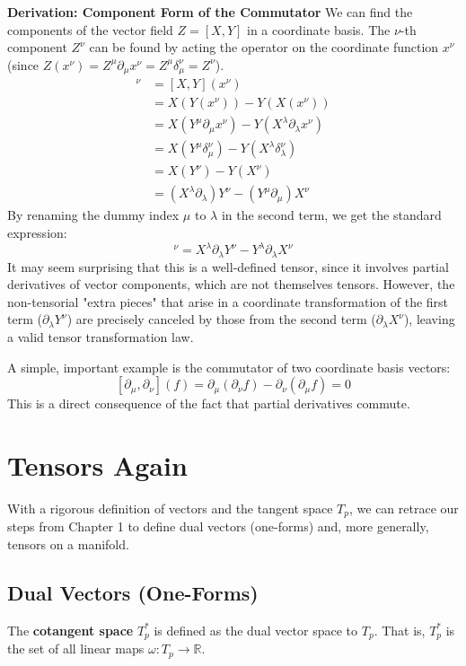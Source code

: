 \documentclass[11pt, a4paper]{report}
\begin{document}
\textbf{Derivation: Component Form of the Commutator}
We can find the components of the vector field $Z = [X, Y]$ in a coordinate basis. The $\nu$-th component $Z^\nu$ can be found by acting the operator on the coordinate function $x^\nu$ (since $Z(x^\nu) = Z^\mu \partial_\mu x^\nu = Z^\mu \delta^\nu_\mu = Z^\nu$).
\begin{align*}
    [X, Y]^\nu &= [X, Y](x^\nu) \\
    &= X(Y(x^\nu)) - Y(X(x^\nu)) \\
    &= X(Y^\mu \partial_\mu x^\nu) - Y(X^\lambda \partial_\lambda x^\nu) \\
    &= X(Y^\mu \delta^\nu_\mu) - Y(X^\lambda \delta^\nu_\lambda) \\
    &= X(Y^\nu) - Y(X^\nu) \\
    &= (X^\lambda \partial_\lambda) Y^\nu - (Y^\mu \partial_\mu) X^\nu
\end{align*}
By renaming the dummy index $\mu$ to $\lambda$ in the second term, we get the standard expression:
\begin{equation}
    [X, Y]^\nu = X^\lambda \partial_\lambda Y^\nu - Y^\lambda \partial_\lambda X^\nu
\end{equation}
It may seem surprising that this is a well-defined tensor, since it involves partial derivatives of vector components, which are not themselves tensors. However, the non-tensorial "extra pieces" that arise in a coordinate transformation of the first term ($\partial_\lambda Y^\nu$) are precisely canceled by those from the second term ($\partial_\lambda X^\nu$), leaving a valid tensor transformation law.

A simple, important example is the commutator of two coordinate basis vectors:
\[
    [\partial_\mu, \partial_\nu](f) = \partial_\mu(\partial_\nu f) - \partial_\nu(\partial_\mu f) = 0
\]
This is a direct consequence of the fact that partial derivatives commute.
\section{Tensors Again}

With a rigorous definition of vectors and the tangent space $T_p$, we can retrace our steps from Chapter 1 to define dual vectors (one-forms) and, more generally, tensors on a manifold.

\subsection*{Dual Vectors (One-Forms)}
The \textbf{cotangent space} $T_p^*$ is defined as the dual vector space to $T_p$. That is, $T_p^*$ is the set of all linear maps $\omega: T_p \to \mathbb{R}$.
\end{document}
